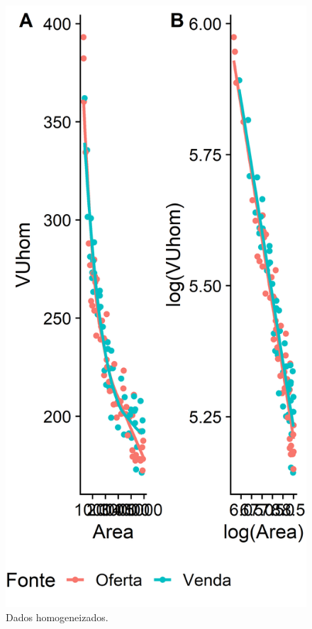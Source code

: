 \documentclass{article}
\begin{document}
\begin{figure}
\centering
\includegraphics{./images/dadosHomogeneizados2-1.png}
\caption{Dados homogeneizados.}
\end{figure}
\end{document}
